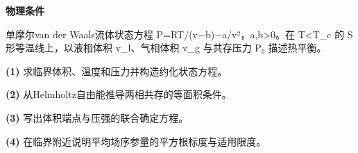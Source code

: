 \textbf{物理条件}\par 单摩尔van der Waals流体状态方程 P=RT/(v−b)−a/v²，a,b>0。在 T<T\_c 的 S形等温线上，以液相体积 v\_l、气相体积 v\_g 与共存压力 P₀ 描述热平衡。
\par\noindent\textbf{(1)} 求临界体积、温度和压力并构造约化状态方程。
\par\noindent\textbf{(2)} 从Helmholtz自由能推导两相共存的等面积条件。
\par\noindent\textbf{(3)} 写出体积端点与压强的联合确定方程。
\par\noindent\textbf{(4)} 在临界附近说明平均场序参量的平方根标度与适用限度。
